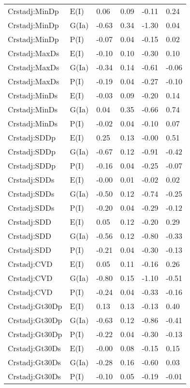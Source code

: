 \begin{center}
\begin{longtable}{|p{1.1in}|p{0.7in}|p{0.7in}|p{0.6in}|p{0.6in}|p{0.6in}|}
  Crstadj:MinDp & E(I) & 0.06 & 0.09 & -0.11 & 0.24 \\ 
  Crstadj:MinDp & G(Ia) & -0.63 & 0.34 & -1.30 & 0.04 \\ 
  Crstadj:MinDp & P(I) & -0.07 & 0.04 & -0.15 & 0.02 \\ 
  Crstadj:MaxDs & E(I) & -0.10 & 0.10 & -0.30 & 0.10 \\ 
  Crstadj:MaxDs & G(Ia) & -0.34 & 0.14 & -0.61 & -0.06 \\ 
  Crstadj:MaxDs & P(I) & -0.19 & 0.04 & -0.27 & -0.10 \\ 
  Crstadj:MinDs & E(I) & -0.03 & 0.09 & -0.20 & 0.14 \\ 
  Crstadj:MinDs & G(Ia) & 0.04 & 0.35 & -0.66 & 0.74 \\ 
  Crstadj:MinDs & P(I) & -0.02 & 0.04 & -0.10 & 0.07 \\ 
  Crstadj:SDDp & E(I) & 0.25 & 0.13 & -0.00 & 0.51 \\ 
  Crstadj:SDDp & G(Ia) & -0.67 & 0.12 & -0.91 & -0.42 \\ 
  Crstadj:SDDp & P(I) & -0.16 & 0.04 & -0.25 & -0.07 \\ 
  Crstadj:SDDs & E(I) & -0.00 & 0.01 & -0.02 & 0.02 \\ 
  Crstadj:SDDs & G(Ia) & -0.50 & 0.12 & -0.74 & -0.25 \\ 
  Crstadj:SDDs & P(I) & -0.20 & 0.04 & -0.29 & -0.12 \\ 
  Crstadj:SDD & E(I) & 0.05 & 0.12 & -0.20 & 0.29 \\ 
  Crstadj:SDD & G(Ia) & -0.56 & 0.12 & -0.80 & -0.33 \\ 
  Crstadj:SDD & P(I) & -0.21 & 0.04 & -0.30 & -0.13 \\ 
  Crstadj:CVD & E(I) & 0.05 & 0.11 & -0.16 & 0.26 \\ 
  Crstadj:CVD & G(Ia) & -0.80 & 0.15 & -1.10 & -0.51 \\ 
  Crstadj:CVD & P(I) & -0.24 & 0.04 & -0.33 & -0.16 \\ 
  Crstadj:Gt30Dp & E(I) & 0.13 & 0.13 & -0.13 & 0.40 \\ 
  Crstadj:Gt30Dp & G(Ia) & -0.63 & 0.12 & -0.86 & -0.41 \\ 
  Crstadj:Gt30Dp & P(I) & -0.22 & 0.04 & -0.30 & -0.13 \\ 
  Crstadj:Gt30Ds & E(I) & -0.00 & 0.08 & -0.15 & 0.15 \\ 
  Crstadj:Gt30Ds & G(Ia) & -0.28 & 0.16 & -0.60 & 0.03 \\ 
  Crstadj:Gt30Ds & P(I) & -0.10 & 0.05 & -0.19 & -0.01 \\ 

\end{longtable}
\end{center}
